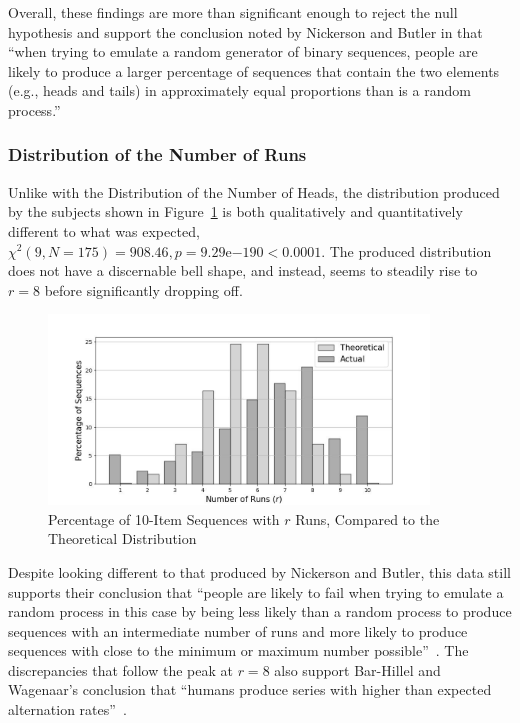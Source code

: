 Overall, these findings are more than significant enough to reject the null hypothesis and support the conclusion noted by Nickerson and Butler in that ``when trying to emulate a random generator of binary sequences, people are likely to produce a larger percentage of sequences that contain the two elements (e.g., heads and tails) in approximately equal proportions than is a random process.''~\cite{nickerson:2009}

\subsubsection{Distribution of the Number of Runs}
Unlike with the Distribution of the Number of Heads, the distribution produced by the subjects shown in Figure~\ref{distribution_of_the_number_of_runs} is both qualitatively and quantitatively different to what was expected, $\chi^2(9, N=175) = 908.46, p=9.29\mathrm{e}{-190} < 0.0001$. The produced distribution does not have a discernable bell shape, and instead, seems to steadily rise to $r = 8$ before significantly dropping off.


\begin{figure}[h]
    \centering
    \includegraphics[width=0.9\textwidth]{images/combined_number_of_runs.jpg}
    \caption{Percentage of 10-Item Sequences with $r$ Runs, Compared to the Theoretical Distribution}\label{distribution_of_the_number_of_runs}
\end{figure}

Despite looking different to that produced by Nickerson and Butler, this data still supports their conclusion that ``people are likely to fail when trying to emulate a random process \textendash{} in this case by being less likely than a random process to produce sequences with an intermediate number of runs and more likely to produce sequences with close to the minimum or maximum number possible''~\cite{nickerson:2009}. The discrepancies that follow the peak at $r = 8$ also support Bar-Hillel and Wagenaar's conclusion that ``humans produce series with higher than expected alternation rates''~\cite{bar-hillel:1991}.

